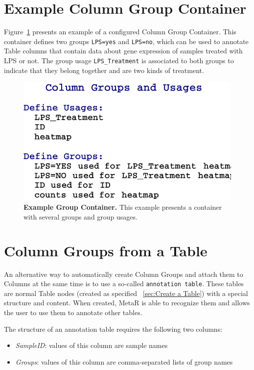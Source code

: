 \section{Example Column Group Container}
Figure~\ref{fig:ExampleGroupContainer} presents an example of a configured Column Group Container. This container defines two groups \texttt{LPS=yes} and \texttt{LPS=no}, which can be used to annotate Table columns that contain data about gene expression of samples treated with LPS or not.  The group usage \texttt{LPS\_Treatment} is associated to both groups to indicate that they belong together and are two kinds of treatment.

\begin{figure}
  \centering
  \includegraphics[width=\figWidthNarrow]{figures/ExampleGroupContainer.pdf}
\caption[Example Group Container.]{\textbf{Example Group Container.} This example presents a container with several groups and group usages.}
\label{fig:ExampleGroupContainer}
\end{figure}

\section{Column Groups from a Table}\label{sec:ColumnGroupsTable}
An alternative way to automatically create Column Groups and attach them to Columns at the same time is to use a so-called \texttt{annotation table}. These tables are normal Table nodes (created as specified ~\ref{sec:Create a Table}) with a special structure and content. When created, MetaR is able to recognize them and allows the user to use them to annotate other tables. 

The structure of an annotation table requires the following two columns: 
\begin{itemize}
\item \textit{SampleID}: values of this column are sample names
\item \textit{Groups}: values of this column are comma-separated lists of group names
\end{itemize}

